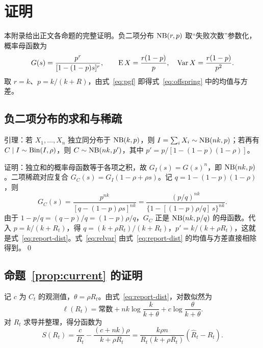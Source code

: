 \section{证明}
\label{app:proofs}

本附录给出正文各命题的完整证明。负二项分布 $\operatorname{NB}(r,p)$ 取“失败次数”参数化，概率母函数为
\begin{equation}
  G(s)=\frac{p^{r}}{[1-(1-p)s]^{r}},\qquad \operatorname{E} X=\frac{r(1-p)}{p},\quad \operatorname{Var} X=\frac{r(1-p)}{p^2}.
  \label{eq:pgf}
\end{equation}
取 $r=k$、$p=k/(k+R)$，由式~\eqref{eq:pgf} 即得式~\eqref{eq:offspring} 中的均值与方差。

\subsection{负二项分布的求和与稀疏}
\label{app:lemma}

引理：若 $X_1,\dots,X_n$ 独立同分布于 $\operatorname{NB}(k,p)$，则 $I=\sum_iX_i\sim\operatorname{NB}(nk,p)$；若再有 $C\mid I\sim\operatorname{Bin}(I,\rho)$，则 $C\sim\operatorname{NB}(nk,p')$，其中 $p'=p/[1-(1-p)(1-\rho)]$。

证明：独立和的概率母函数等于各项之积，故 $G_I(s)=G(s)^n$，即 $\operatorname{NB}(nk,p)$。二项稀疏对应复合 $G_C(s)=G_I(1-\rho+\rho s)$。记 $q=1-(1-p)(1-\rho)$，则
\begin{equation*}
  G_C(s)=\frac{p^{nk}}{[q-(1-p)\rho s]^{nk}}=\frac{(p/q)^{nk}}{\{1-[(1-p)\rho/q]\,s\}^{nk}}.
\end{equation*}
由于 $1-p/q=(q-p)/q=(1-p)\rho/q$，$G_C$ 正是 $\operatorname{NB}(nk,p/q)$ 的母函数。代入 $p=k/(k+R_t)$，得 $q=(k+\rho R_t)/(k+R_t)$，$p'=k/(k+\rho R_t)$，这就是式~\eqref{eq:report-dist}。式~\eqref{eq:relvar} 由式~\eqref{eq:report-dist} 的均值与方差直接相除得到。\qed

\subsection{\texorpdfstring{命题~\ref{prop:current} 的证明}{命题 1 的证明}}

记 $c$ 为 $C_t$ 的观测值，$\theta=\rho R_t$。由式~\eqref{eq:report-dist}，对数似然为
\begin{equation*}
  \ell(R_t)=\text{常数}+nk\log\frac{k}{k+\theta}+c\log\frac{\theta}{k+\theta}.
\end{equation*}
对 $R_t$ 求导并整理，得分函数为
\begin{equation}
  S(R_t)=\frac{c}{R_t}-\frac{(c+nk)\rho}{k+\rho R_t}
  =\frac{k\rho n}{R_t(k+\rho R_t)}(\widehat R_t-R_t).
  \label{eq:score}
\end{equation}

